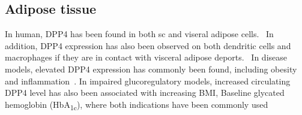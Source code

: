 \subsection{Adipose tissue}
In human, DPP4 has been found in both sc and viseral adipose cells.~\cite{Lamers2011} In addition, DPP4 expression has also been observed on both dendritic cells and macrophages if they are in contact with visceral adipose deports.~\cite{Zhong2013} In disease models, elevated DPP4 expression has commonly been found, including obesity and inflammation~\cite{Zhong2013}. In impaired glucoregulatory models, increased circulating DPP4 level has also been associated with increasing BMI, Baseline glycated hemoglobin (HbA\textsubscript{1c}), where both indications have been commonly used 